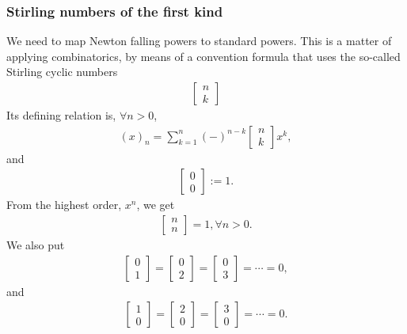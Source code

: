 \documentclass[11pt]{book}
\begin{document}
\subsubsection{Stirling numbers of the first kind}
We need to map Newton falling powers to standard powers.  
This is a matter of applying combinatorics, by means of a convention formula that uses the so-called Stirling cyclic numbers 
\begin{eqnarray}
\left[\begin{array}{c}n \\k \end{array}\right]
\end{eqnarray}
Its defining relation is, $\forall n > 0$,
\begin{eqnarray}
(x)_n = \sum_{k=1}^n (-)^{n-k} \left[\begin{array}{c}n \\k \end{array}\right] x^k, 
\end{eqnarray}
and
\begin{eqnarray}
\left[\begin{array}{c}0 \\0 \end{array}\right] := 1.
\end{eqnarray}
From the highest order, $x^n$, we get
\begin{eqnarray}
\left[\begin{array}{c}n \\n \end{array}\right] = 1, \forall n > 0.
\end{eqnarray}
We also put
\begin{eqnarray}
\left[\begin{array}{c}0 \\1 \end{array}\right] = \left[\begin{array}{c}0 \\2 \end{array}\right] = \left[\begin{array}{c}0 \\3 \end{array}\right] = \cdots = 0,
\end{eqnarray}
and
\begin{eqnarray}
\left[\begin{array}{c}1 \\ 0 \end{array}\right] = \left[\begin{array}{c}2  \\ 0 \end{array}\right] =\left[\begin{array}{c}3 \\ 0 \end{array}\right] = \cdots = 0.
\end{eqnarray}
\end{document}

